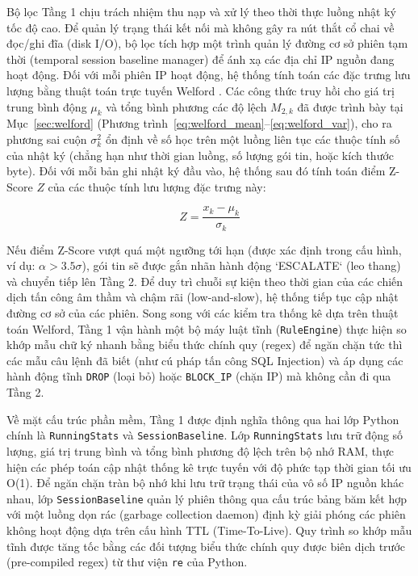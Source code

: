 Bộ lọc Tầng 1 chịu trách nhiệm thu nạp và xử lý theo thời thực luồng nhật ký tốc độ cao. Để quản lý trạng thái kết nối mà không gây ra nút thắt cổ chai về đọc/ghi đĩa (disk I/O), bộ lọc tích hợp một trình quản lý đường cơ sở phiên tạm thời (temporal session baseline manager) để ánh xạ các địa chỉ IP nguồn đang hoạt động. Đối với mỗi phiên IP hoạt động, hệ thống tính toán các đặc trưng lưu lượng bằng thuật toán trực tuyến Welford \cite{welford1962}. Các công thức truy hồi cho giá trị trung bình động $\mu_k$ và tổng bình phương các độ lệch $M_{2,k}$ đã được trình bày tại Mục~\ref{sec:welford} (Phương trình~\ref{eq:welford_mean}--\ref{eq:welford_var}), cho ra phương sai cuộn $\sigma_k^2$ ổn định về số học trên một luồng liên tục các thuộc tính số của nhật ký (chẳng hạn như thời gian luồng, số lượng gói tin, hoặc kích thước byte). Đối với mỗi bản ghi nhật ký đầu vào, hệ thống sau đó tính toán điểm Z-Score $Z$ của các thuộc tính lưu lượng đặc trưng này:

\begin{equation}
    Z = \frac{x_k - \mu_k}{\sigma_k}
\end{equation}

Nếu điểm Z-Score vượt quá một ngưỡng tới hạn (được xác định trong cấu hình, ví dụ: $\alpha > 3.5\sigma$), gói tin sẽ được gắn nhãn hành động `ESCALATE` (leo thang) và chuyển tiếp lên Tầng 2. Để duy trì chuỗi sự kiện theo thời gian của các chiến dịch tấn công âm thầm và chậm rãi (low-and-slow), hệ thống tiếp tục cập nhật đường cơ sở của các phiên. Song song với các kiểm tra thống kê dựa trên thuật toán Welford, Tầng 1 vận hành một bộ máy luật tĩnh (\texttt{RuleEngine}) thực hiện so khớp mẫu chữ ký nhanh bằng biểu thức chính quy (regex) để ngăn chặn tức thì các mẫu câu lệnh đã biết (như cú pháp tấn công SQL Injection) và áp dụng các hành động tĩnh \texttt{DROP} (loại bỏ) hoặc \texttt{BLOCK\_IP} (chặn IP) mà không cần đi qua Tầng 2.

Về mặt cấu trúc phần mềm, Tầng 1 được định nghĩa thông qua hai lớp Python chính là \texttt{RunningStats} và \texttt{SessionBaseline}. Lớp \texttt{RunningStats} lưu trữ động số lượng, giá trị trung bình và tổng bình phương độ lệch trên bộ nhớ RAM, thực hiện các phép toán cập nhật thống kê trực tuyến với độ phức tạp thời gian tối ưu O(1). Để ngăn chặn tràn bộ nhớ khi lưu trữ trạng thái của vô số IP nguồn khác nhau, lớp \texttt{SessionBaseline} quản lý phiên thông qua cấu trúc bảng băm kết hợp với một luồng dọn rác (garbage collection daemon) định kỳ giải phóng các phiên không hoạt động dựa trên cấu hình TTL (Time-To-Live). Quy trình so khớp mẫu tĩnh được tăng tốc bằng các đối tượng biểu thức chính quy được biên dịch trước (pre-compiled regex) từ thư viện \texttt{re} của Python.

